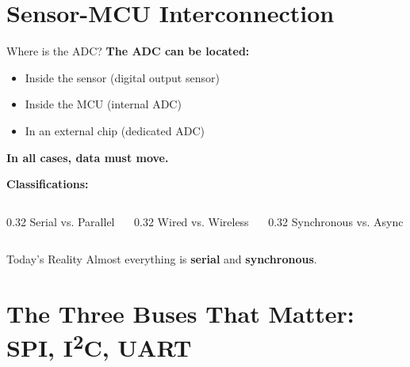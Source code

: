 \documentclass[aspectratio=169,11pt]{beamer}
\begin{document}
\section{Sensor-MCU Interconnection}

\begin{frame}{Where is the ADC?}
    \textbf{The ADC can be located:}
    \begin{itemize}
        \item Inside the sensor (digital output sensor)
        \item Inside the MCU (internal ADC)
        \item In an external chip (dedicated ADC)
    \end{itemize}
    
    \vspace{0.5cm}
    \textbf{In all cases, data must move.}
    
    \vspace{0.3cm}
    \textbf{Classifications:}
    \begin{columns}[T]
        \begin{column}{0.32\textwidth}
            Serial vs. Parallel
        \end{column}
        \begin{column}{0.32\textwidth}
            Wired vs. Wireless
        \end{column}
        \begin{column}{0.32\textwidth}
            Synchronous vs. Async
        \end{column}
    \end{columns}
    
    \vspace{0.3cm}
    \begin{block}{Today's Reality}
        Almost everything is \textbf{serial} and \textbf{synchronous}.
    \end{block}
\end{frame}

\section{The Three Buses That Matter: SPI, I\textsuperscript{2}C, UART}
\end{document}

